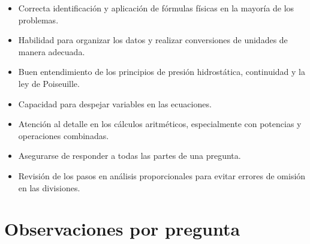 \documentclass[11pt,a4paper]{article}
\begin{document}
\vspace{4pt}
\begin{minipage}[t]{0.48\linewidth}
  \begin{tcolorbox}[cajaFortaleza, title={Fortalezas}]
\begin{itemize}[leftmargin=1.5em, itemsep=2pt]
  \item Correcta identificación y aplicación de fórmulas físicas en la mayoría de los problemas.
  \item Habilidad para organizar los datos y realizar conversiones de unidades de manera adecuada.
  \item Buen entendimiento de los principios de presión hidrostática, continuidad y la ley de Poiseuille.
  \item Capacidad para despejar variables en las ecuaciones.
\end{itemize}
  \end{tcolorbox}
\end{minipage}
\hfill
\begin{minipage}[t]{0.48\linewidth}
  \begin{tcolorbox}[cajaMejora, title={Areas de mejora}]
\begin{itemize}[leftmargin=1.5em, itemsep=2pt]
  \item Atención al detalle en los cálculos aritméticos, especialmente con potencias y operaciones combinadas.
  \item Asegurarse de responder a todas las partes de una pregunta.
  \item Revisión de los pasos en análisis proporcionales para evitar errores de omisión en las divisiones.
\end{itemize}
  \end{tcolorbox}
\end{minipage}

\section*{Observaciones por pregunta}
\end{document}
